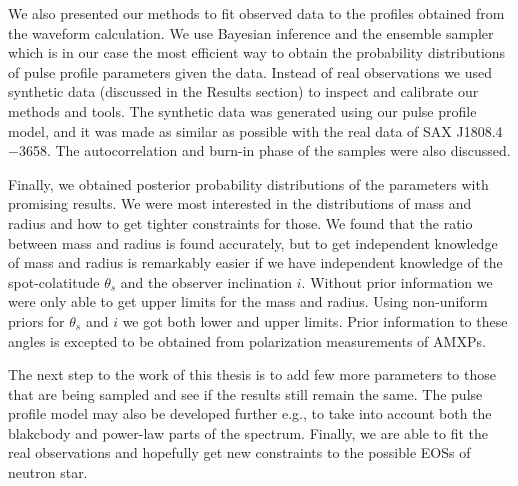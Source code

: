\documentclass{wihuri}
\def\source{SAX J1808.4$-$3658}
\def\thetas{\theta_{s}}
\begin{document}
We also presented our methods to fit observed data to the profiles obtained from the waveform calculation. We use Bayesian inference and the ensemble sampler which is in our case the most efficient way to obtain the probability distributions of pulse profile parameters given the data. Instead of real observations we used synthetic data (discussed in the Results section) to inspect and calibrate our methods and tools. The synthetic data was generated using our pulse profile model, and it was made as similar as possible with the real data of \source. The autocorrelation and burn-in phase of the samples were also discussed.

Finally, we obtained posterior probability distributions of the parameters with promising results. We were most interested in the distributions of mass and radius and how to get tighter constraints for those. We found that the ratio between mass and radius is found accurately, but to get independent knowledge of mass and radius is remarkably easier if we have independent knowledge of the spot-colatitude $\thetas$ and the observer inclination $i$. Without prior information we were only able to get upper limits for the mass and radius. Using non-uniform priors for $\thetas$ and $i$ we got both lower and upper limits. Prior information to these angles is excepted to be obtained from polarization measurements of AMXPs.  

The next step to the work of this thesis is to add few more parameters to those that are being sampled and see if the results still remain the same. The pulse profile model may also be developed further e.g., to take into account both the blakcbody and power-law parts of the spectrum. Finally, we are able to fit the real observations and hopefully get new constraints to the possible EOSs of neutron star.  





\iffalse
\begin{figure}
\begin{center}
\setlength{\unitlength}{1cm}
\begin{picture}(6,6)(-3,-3)
\put(-1.5,0){\vector(1,0){3}}
\put(2.7,-0.1){$\chi$}
\put(0,-1.5){\vector(0,1){3}}
\multiput(-2.5,1)(0.4,0){13}
{\line(1,0){0.2}}
\multiput(-2.5,-1)(0.4,0){13}
{\line(1,0){0.2}}
\put(0.2,1.4)
{$\beta=v/c=\tanh\chi$}
\qbezier(0,0)(0.8853,0.8853)
(2,0.9640)
\qbezier(0,0)(-0.8853,-0.8853)
(-2,-0.9640)
\end{picture}
\caption{Tässä on hieno kuva}
\label{kuva1}
\end{center}
\end{figure}
\fi
\end{document}
